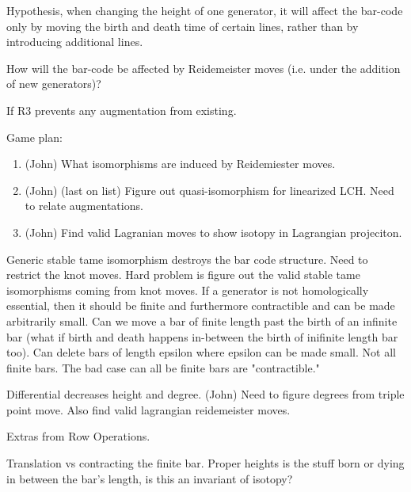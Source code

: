 \documentclass[General-Information/editedlog.tex]{subfiles}
\begin{document}
\begin{question}
Hypothesis, when changing the height of one generator, it will affect the bar-code only by moving the birth and death time of certain lines, rather than by introducing additional lines.
\end{question}

\begin{question}
How will the bar-code be affected by Reidemeister moves (i.e. under the addition of new generators)?
\end{question}

If R3 prevents any augmentation from existing.

\begin{question}
    Game plan:
        \begin{enumerate}
            \item (John) What isomorphisms are induced by Reidemiester moves.
            \item (John) (last on list) Figure out quasi-isomorphism for linearized LCH. Need to relate augmentations.
            \item (John) Find valid Lagranian moves to show isotopy in Lagrangian projeciton.
        \end{enumerate}
\end{question}
Generic stable tame isomorphism destroys the bar code structure. Need to restrict the knot moves. Hard problem is figure out the valid stable tame isomorphisms coming from knot moves. If a generator is not homologically essential, then it should be finite and furthermore contractible and can be made arbitrarily small. Can we move a bar of finite length past the birth of an infinite bar (what if birth and death happens in-between the birth of inifinite length bar too). Can delete bars of length epsilon where epsilon can be made small. Not all finite bars. The bad case can all be finite bars are "contractible."

Differential decreases height and degree. (John) Need to figure degrees from triple point move. Also find valid lagrangian reidemeister moves.

Extras from Row Operations.

Translation vs contracting the finite bar. Proper heights is the stuff born or dying in between the bar's length, is this an invariant of isotopy?
\end{document}
